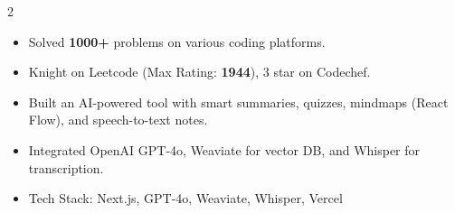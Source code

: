\documentclass[10pt,a4paper]{altacv}
\begin{document}
\begin{paracol}{2}
\vspace{0.3cm}


\begin{itemize}
\item Solved \textbf{1000+} problems on various coding platforms.
\item Knight on Leetcode (Max Rating: \textbf{1944}), 3 star on Codechef.
\end{itemize}

\vspace{0.3cm}


\begin{itemize}
\item Built an AI-powered tool with smart summaries, quizzes, mindmaps (React Flow), and speech-to-text notes.
\item Integrated OpenAI GPT-4o, Weaviate for vector DB, and Whisper for transcription.
\item Tech Stack: Next.js, GPT-4o, Weaviate, Whisper, Vercel
\end{itemize}

\end{paracol}
\end{document}
